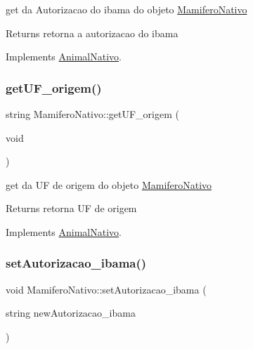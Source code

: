 get da Autorizacao do ibama do objeto \mbox{\hyperlink{class_mamifero_nativo}{Mamifero\+Nativo}} 

\begin{DoxyReturn}{Returns}
retorna a autorizacao do ibama 
\end{DoxyReturn}


Implements \mbox{\hyperlink{class_animal_nativo}{Animal\+Nativo}}.

\mbox{\label{class_mamifero_nativo_ac5eccd191e70a72e25cab761a460136a}} 
\subsubsection{\texorpdfstring{getUF\_origem()}{getUF\_origem()}}
{\footnotesize\ttfamily string Mamifero\+Nativo\+::get\+U\+F\+\_\+origem (\begin{DoxyParamCaption}\item[{void}]{ }\end{DoxyParamCaption})\hspace{0.3cm}{\ttfamily [virtual]}}



get da UF de origem do objeto \mbox{\hyperlink{class_mamifero_nativo}{Mamifero\+Nativo}} 

\begin{DoxyReturn}{Returns}
retorna UF de origem 
\end{DoxyReturn}


Implements \mbox{\hyperlink{class_animal_nativo}{Animal\+Nativo}}.

\mbox{\label{class_mamifero_nativo_a3426276cd2af2e7740192b26f34475e9}} 
\subsubsection{\texorpdfstring{setAutorizacao\_ibama()}{setAutorizacao\_ibama()}}
{\footnotesize\ttfamily void Mamifero\+Nativo\+::set\+Autorizacao\+\_\+ibama (\begin{DoxyParamCaption}\item[{string}]{new\+Autorizacao\+\_\+ibama }\end{DoxyParamCaption})\hspace{0.3cm}{\ttfamily [virtual]}}



